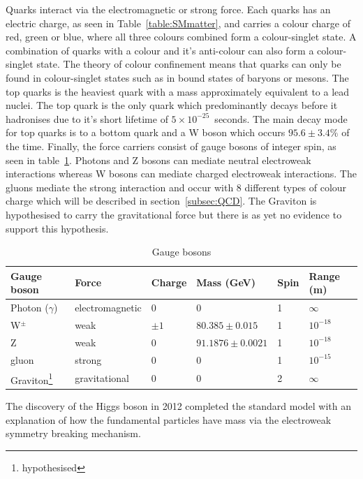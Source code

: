Quarks interact via the electromagnetic or strong force. Each quarks has an electric charge, as seen in Table~\ref{table:SMmatter}, and carries a colour charge of red, green or blue, where all three colours combined form a colour-singlet state. A combination of quarks with a colour and it's anti-colour can also form a colour-singlet state. The theory of colour confinement means that quarks can only be found in colour-singlet states such as in bound states of baryons or mesons. 
The top quarks is the heaviest quark with a mass approximately equivalent to a lead nuclei. The top quark is the only quark which predominantly decays before it hadronises due to it's short lifetime of $5\times10^{-25}$~seconds. The main decay mode for top quarks is to a bottom quark and a W boson which occurs $95.6\pm3.4\%$ of the time.
Finally, the force carriers consist of gauge bosons of integer spin, as seen in table~\ref{table:SMbosons}. Photons and Z bosons can mediate neutral electroweak interactions whereas W bosons can mediate charged electroweak interactions. The gluons mediate the strong interaction and occur with 8 different types of colour charge which will be described in section~\ref{subsec:QCD}. 
The Graviton is hypothesised to carry the gravitational force but there is as yet no evidence to support this hypothesis.
\begin{table}[ht!]
\centering
\caption{Gauge bosons}
\footnotesize
\label{table:SMbosons}
\begin{tabular}{|l|l|l|l|l|l|}
\hline
Gauge boson                       & Force           & Charge & Mass (GeV) & Spin & Range (m)  \\ \hline \hline
Photon ($\gamma$)                 & electromagnetic & 0      & 0          & 1    & $\infty$   \\ \hline
W$^{\pm}$                         & weak            & $\pm1$ & $80.385\pm0.015$           & 1    & $10^{-18}$ \\ \hline
Z                                 & weak            & 0      & $91.1876\pm0.0021$           & 1    & $10^{-18}$ \\ \hline
gluon                             & strong          & 0      & 0          & 1    & $10^{-15}$ \\ \hline
Graviton\footnote{hypothesised} & gravitational   & 0      & 0          & 2    & $\infty$   \\ \hline
\end{tabular}
\end{table}

The discovery of the Higgs boson in 2012 completed the standard model with an explanation of how the fundamental particles have mass via the electroweak symmetry breaking mechanism.

